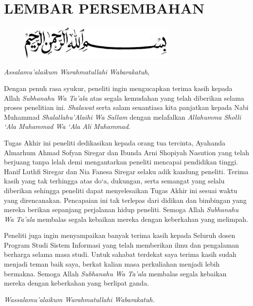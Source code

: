 %
%
%
%

\chapter*{LEMBAR PERSEMBAHAN}

\begin{figure}
	\centering
	\includegraphics[width=0.7\textwidth]{konten/gambar/bismillah.jpg}
\end{figure}

\textit{Assalamu’alaikum Warahmatullahi Wabarakatuh},

Dengan penuh rasa syukur, peneliti ingin mengucapkan terima kasih kepada Allah \textit{Subhanahu Wa Ta’ala} atas segala kemudahan yang telah diberikan selama proses penelitian ini. \textit{Shalawat} serta salam senantiasa kita panjatkan kepada Nabi Muhammad \textit{Shalallahu’Alaihi Wa Sallam} dengan melafalkan \textit{Allahumma Sholli `Ala Muhammad Wa `Ala Ali Muhammad}.

Tugas Akhir ini peneliti dedikasikan kepada orang tua tercinta, Ayahanda Almarhum Ahmad Sofyan Siregar dan Ibunda Arni Shopiyah Nasution yang telah berjuang tanpa lelah demi mengantarkan peneliti mencapai pendidikan tinggi. Hanif Luthfi Siregar dan Nia Fanesa Siregar selaku adik kandung peneliti. Terima kasih yang tak terhingga atas do`a, dukungan, serta semangat yang selalu diberikan sehingga peneliti dapat menyelesaikan Tugas Akhir ini sesuai waktu yang direncanakan. Pencapaian ini tak terlepas dari didikan dan bimbingan yang mereka berikan sepanjang perjalanan hidup peneliti. Semoga Allah \textit{Subhanahu Wa Ta’ala} membalas segala kebaikan mereka dengan keberkahan yang melimpah.

Peneliti juga ingin menyampaikan banyak terima kasih kepada Seluruh dosen Program Studi Sistem Informasi yang telah memberikan ilmu dan pengalaman berharga selama masa studi. Untuk sahabat terdekat saya terima kasih sudah menjadi teman baik saya, berkat kalian masa perkuliahan menjadi lebih bermakna. Semoga Allah \textit{Subhanahu Wa Ta’ala} membalas segala kebaikan mereka dengan keberkahan yang berlipat ganda.

\textit{Wassalamu’alaikum Warahmatullahi Wabarakatuh.}